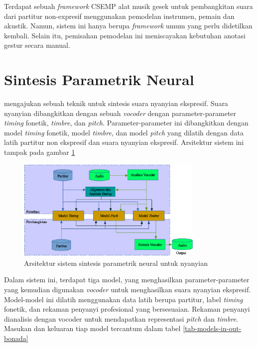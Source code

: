 Terdapat sebuah \textit{framework} CSEMP alat musik gesek untuk pembangkitan suara dari partitur non-expresif \parencite{perez2015} menggunakan pemodelan instrumen, pemain dan akustik. Namun, sistem ini hanya berupa \textit{framework} umum yang perlu didetilkan kembali. Selain itu, pemisahan pemodelan ini meniscayakan kebutuhan anotasi gestur secara manual.

\section{Sintesis Parametrik Neural}

\citet{bonada2017singing} mengajukan sebuah teknik untuk sintesis suara nyanyian ekspresif. Suara nyanyian dibangkitkan dengan sebuah \textit{vocoder} dengan parameter-parameter \textit{timing} fonetik, \textit{timbre}, dan \textit{pitch}. Parameter-parameter ini dibangkitkan dengan model \textit{timing} fonetik, model \textit{timbre}, dan model \textit{pitch} yang dilatih dengan data latih partitur non ekspresif dan suara nyanyian ekspresif. Arsitektur sistem ini tampak pada gambar \ref{fig-system-overview-bonada}

\begin{figure}[h]
    \centering
    \includegraphics[width=0.8\textwidth]{resources/system-overview.eps}
    \caption{Arsitektur sistem sintesis parametrik neural untuk nyanyian \parencite{bonada2017singing}}\label{fig-system-overview-bonada}
\end{figure}

Dalam sistem ini, terdapat tiga model, yang menghasilkan parameter-parameter yang kemudian digunakan \textit{vocoder} untuk menghasilkan suara nyanyian ekspresif. Model-model ini dilatih menggunakan data latih berupa partitur, label \textit{timing} fonetik, dan rekaman penyanyi profesional yang bersesuaian. Rekaman penyanyi dianalisis dengan vocoder untuk mendapatkan representasi \textit{pitch} dan \textit{timbre}. Masukan dan keluaran tiap model tercantum dalam tabel \ref{tab-models-in-out-bonada}

